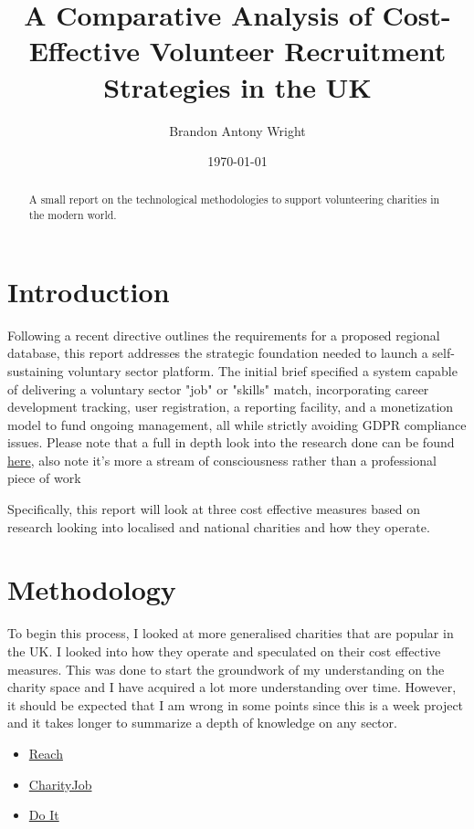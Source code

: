 \documentclass[11pt,a4paper]{article}
\title{A Comparative Analysis of Cost-Effective Volunteer Recruitment Strategies in the UK}
\author{Brandon Antony Wright}
\date{\today}
\begin{document}
\maketitle

\begin{abstract}
A small report on the technological methodologies to support volunteering charities in the modern world. 
\end{abstract}

\section{Introduction}

Following a recent directive outlines the requirements for a proposed regional database, this report addresses the strategic foundation needed to launch a self-sustaining voluntary sector platform. The initial brief specified a system capable of delivering a voluntary sector "job" or "skills" match, incorporating career development tracking, user registration, a reporting facility, and a monetization model to fund ongoing management, all while strictly avoiding GDPR compliance issues. Please note that a full in depth look into the research done can be found \href{https://github.com/Barnold8/voluntary-sector-jobmatch/blob/main/Docs/Email.md}{here}, also note it's more a stream of consciousness rather than a professional piece of work

\hfill \break
Specifically, this report will look at three cost effective measures based on research looking into localised and national charities and how they operate. 

\section{Methodology}

To begin this process, I looked at more generalised charities that are popular in the UK. I looked into how they operate and speculated on their cost effective measures. This was done to start the groundwork of my understanding on the charity space and I have acquired a lot more understanding over time. However, it should be expected that I am wrong in some points since this is a week project and it takes longer to summarize a depth of knowledge on any sector. 

\begin{itemize}
    \item \href{https://reachvolunteering.org.uk/}{Reach} 
    \item \href{https://www.charityjob.co.uk/?source=nav}{CharityJob}
    \item \href{https://www.doit.life}{Do It}
\end{itemize}
\end{document}

